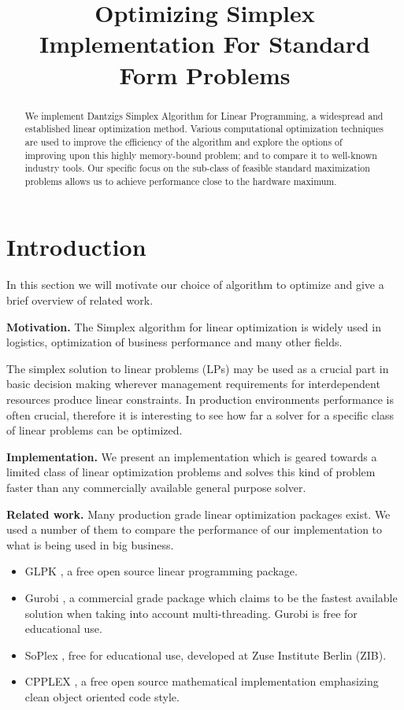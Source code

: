 \documentclass[letterpaper]{article}
\title{Optimizing Simplex Implementation For Standard Form Problems}
\newcommand{\mypar}[1]{{\bf #1.}}
\begin{document}
%
\maketitle
%

\listoftodos

\begin{abstract}
We implement Dantzigs Simplex Algorithm for Linear Programming, a widespread and established linear optimization method.
Various computational optimization techniques are used to improve the efficiency of the algorithm and explore the options of improving upon this highly memory-bound problem;
and to compare it to well-known industry tools.
Our specific focus on the sub-class of feasible standard maximization problems allows us to achieve performance close to the hardware maximum.
\end{abstract}


\section{Introduction}\label{sec:intro}

In this section we will motivate our choice of algorithm to optimize and give
a brief overview of related work.

\mypar{Motivation} The Simplex algorithm for linear optimization is widely
used in logistics, optimization of business performance and many other fields.

The simplex solution to linear problems (LPs) may be used as a crucial part in
basic decision making wherever management requirements for interdependent resources produce linear constraints.
In production environments performance is often crucial, therefore it is interesting to see how far
a solver for a specific class of linear problems can be optimized.

\mypar{Implementation} We present an implementation which is geared towards 
a limited class of linear optimization problems and solves this kind of problem
faster than any commercially available general purpose solver.

\mypar{Related work} Many production grade linear optimization packages exist.
We used a number of them to compare the performance of our implementation to what is being
used in big business.
\begin{itemize}
    \item{GLPK \cite{glpk}, a free open source linear programming package.}
    \item{Gurobi \cite{gurobi}, a commercial grade package which claims to be the fastest available solution when taking into account multi-threading. Gurobi is free for educational use.}
    \item{SoPlex \cite{soplex}, free for educational use, developed at Zuse Institute Berlin (ZIB).}
    \item{CPPLEX \cite{cpplex}, a free open source mathematical implementation emphasizing clean object oriented code style.}
\end{itemize}
\end{document}

